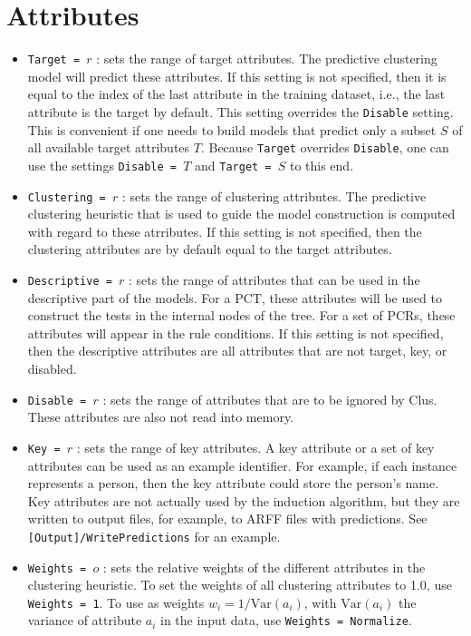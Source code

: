 \documentclass[a4paper]{report}
\begin{document}
\section{Attributes}

\begin{itemize}
\item {\tt Target = $r$} : sets the range of target attributes. The predictive clustering model will predict these attributes. If this setting is not specified, then it is equal to the index of the last attribute in the training dataset, i.e., the last attribute is the target by default. This setting overrides the \texttt{Disable} setting. This is convenient if one needs to build models that predict only a subset $S$ of all available target attributes $T$. Because {\tt Target} overrides {\tt Disable}, one can use the settings {\tt Disable = $T$} and {\tt Target = $S$} to this end. 

\item {\tt Clustering = $r$} : sets the range of clustering attributes. The predictive clustering heuristic that is used to guide the model construction is computed with regard to these atrributes. If this setting is not specified, then the clustering attributes are by default equal to the target attributes.

\item {\tt Descriptive = $r$} : sets the range of attributes that can be used in the descriptive part of the models. For a PCT, these attributes will be used to construct the tests in the internal nodes of the tree. For a set of PCRs, these attributes will appear in the rule conditions. If this setting is not specified, then the descriptive attributes are all attributes that are not target, key, or disabled.

\item {\tt Disable = $r$} : sets the range of attributes that are to be ignored by Clus. These attributes are also not read into memory.

\item {\tt Key = $r$} : sets the range of key attributes. A key attribute or a set of key attributes can be used as an example identifier. For example, if each instance represents a person, then the key attribute could store the person's name. Key attributes are not actually used by the induction algorithm, but they are written to output files, for example, to ARFF files with predictions. See \texttt{[Output]/WritePredictions} for an example.

\item {\tt Weights = $o$} : sets the relative weights of the different attributes in the clustering heuristic. To set the weights of all clustering attributes to 1.0, use {\tt Weights = 1}. To use as  weights $w_i = 1/\mathrm{Var}(a_i)$, with $\mathrm{Var}(a_i)$ the variance of attribute $a_i$ in the input data, use {\tt Weights = Normalize}.
\end{itemize}
\end{document}
